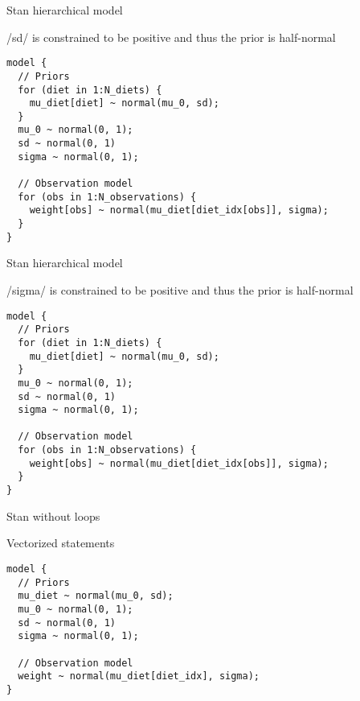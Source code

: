 \documentclass[finnish,english,t]{beamer}
\begin{document}
\begin{frame}[fragile]{Stan hierarchical model}

  \vspace{-0.5\baselineskip}

\rinline/sd/ is constrained to be positive and thus the prior is half-normal
  
\vspace{-0.5\baselineskip}
{\small
\begin{verbatim}
model {
  // Priors
  for (diet in 1:N_diets) {
    mu_diet[diet] ~ normal(mu_0, sd);
  }
  mu_0 ~ normal(0, 1);
  sd ~ normal(0, 1)
  sigma ~ normal(0, 1);
  
  // Observation model
  for (obs in 1:N_observations) {
    weight[obs] ~ normal(mu_diet[diet_idx[obs]], sigma);
  }
}
\end{verbatim}
}
\end{frame}

\begin{frame}[fragile]{Stan hierarchical model}

  \vspace{-0.5\baselineskip}

\rinline/sigma/ is constrained to be positive and thus the prior is half-normal
  
\vspace{-0.5\baselineskip}
{\small
\begin{verbatim}
model {
  // Priors
  for (diet in 1:N_diets) {
    mu_diet[diet] ~ normal(mu_0, sd);
  }
  mu_0 ~ normal(0, 1);
  sd ~ normal(0, 1)
  sigma ~ normal(0, 1);
  
  // Observation model
  for (obs in 1:N_observations) {
    weight[obs] ~ normal(mu_diet[diet_idx[obs]], sigma);
  }
}
\end{verbatim}
}
\end{frame}

\begin{frame}[fragile]{Stan without loops}

  \vspace{-0.5\baselineskip}

  Vectorized statements
  
\vspace{-0.5\baselineskip}
{\small
\begin{verbatim}
model {
  // Priors
  mu_diet ~ normal(mu_0, sd);
  mu_0 ~ normal(0, 1);
  sd ~ normal(0, 1)
  sigma ~ normal(0, 1);
  
  // Observation model
  weight ~ normal(mu_diet[diet_idx], sigma);
}
\end{verbatim}
}

\end{frame}
\end{document}
